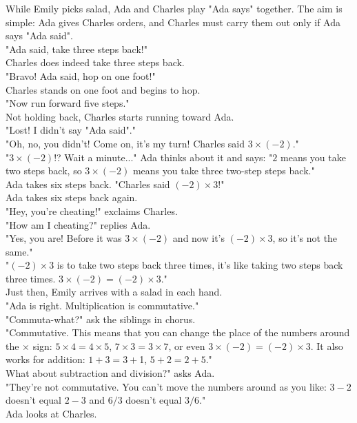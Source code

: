 While Emily picks salad, Ada and Charles play "Ada says" together. The aim is simple: Ada gives Charles orders, and Charles must carry them out only if Ada says "Ada said".\\
"Ada said, take three steps back!"\\
Charles does indeed take three steps back.\\
"Bravo! Ada said, hop on one foot!"\\
Charles stands on one foot and begins to hop.\\
"Now run forward five steps."\\
Not holding back, Charles starts running toward Ada.\\
"Lost! I didn't say "Ada said"."\\
"Oh, no, you didn't! Come on, it's my turn! Charles said $3 \times (-2)$."\\
"$3 \times (-2)$!? Wait a minute..." Ada thinks about it and says: "$2$ means you take two steps back, so $3 \times (-2)$ means you take three two-step steps back."\\
Ada takes six steps back.
"Charles said $(-2) \times 3$!"\\
Ada takes six steps back again.\\
"Hey, you're cheating!" exclaims Charles.\\
"How am I cheating?" replies Ada.\\
"Yes, you are! Before it was $3 \times (-2)$ and now it's $(-2) \times 3$, so it's not the same."\\
"$(-2) \times 3$ is to take two steps back three times, it's like taking two steps back three times. $3 \times (-2) = (-2) \times 3$."\\
Just then, Emily arrives with a salad in each hand.\\
"Ada is right. Multiplication is commutative."\\
"Commuta-what?" ask the siblings in chorus.\\
"Commutative. This means that you can change the place of the numbers around the $\times$ sign: $5 \times 4 = 4 \times 5$, $7 \times 3 = 3 \times 7$, or even $3 \times (-2) = (-2) \times 3$. It also works for addition: $1 +3 = 3 + $1, $5 + 2 = 2 + 5$."\\
What about subtraction and division?" asks Ada.\\
"They're not commutative. You can't move the numbers around as you like: $3 - 2$ doesn't equal $2 - 3$ and $6/3$ doesn't equal $3/6$."\\
Ada looks at Charles.\\
